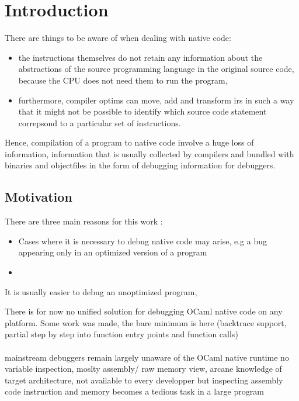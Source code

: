 \chapter{Introduction\label{cha:chapter1}}

There are things to be aware of when dealing with \gls{native} code:
\begin{itemize}
    \item the instructions themselves do not retain any information about the abstractions of the source programming language in the
original source code, because the CPU does not need them to run the program,

\item furthermore, compiler \glspl{optim} can move, add and transform \glspl{ir} in such a way that it might not be possible to identify which source code statement correpsond to a particular set of instructions.
\end{itemize}

Hence, compilation of a program to native code involve a huge loss of information, information that is usually collected by compilers and bundled with binaries and \glspl{objectfile} in the form of debugging information for debuggers.

\section{Motivation\label{sec:moti}}

There are three main reasons for this work :

\begin{itemize}
    \item Cases where it is necessary to debug native code may arise, e.g a bug appearing only in an optimized version of a program
    \item
\end{itemize}

It is usually easier to debug an unoptimized program,

\indent There is for now no unified solution for debugging OCaml native code on any platform.
Some work was made, the bare minimum is here (\gls{backtrace} support, partial step by step into function entry points and function calls)
\\
\\
\indent mainstream debuggers remain largely unaware of the OCaml native runtime %
no variable inspection,
moslty assembly/ raw memory view, arcane knowledge of target architecture, not available to every developper
but inspecting assembly code instruction and memory becomes a tedious task in a large program

